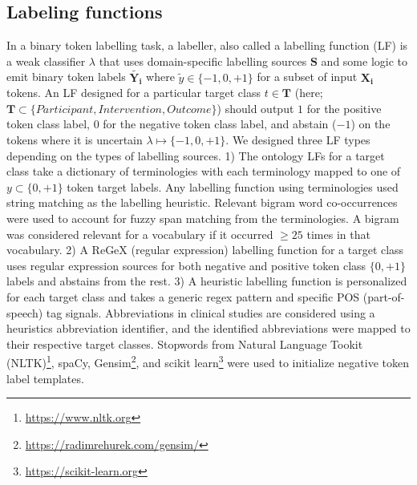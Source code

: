 \documentclass[10.7pt,]{article}
\begin{document}
\subsection{Labeling functions}\label{lfs}
%
In a binary token labelling task, a labeller, also called a labelling function (LF) is a weak classifier $\lambda$ that uses domain-specific labelling sources $\bm{S}$ and some logic to emit binary token labels $ \widetilde{\bm{Y_{i}}}$ where $ \widetilde{y} \in \{-1, 0, +1\}$ for a subset of input $\bm{X_{i}}$ tokens.
An LF designed for a particular target class $t \in \bm{T}$ (here; $\bm{T} \subset \{ Participant, Intervention, Outcome \} $) should output  $1$ for the positive token class label, $0$ for the negative token class label, and abstain ($-1$) on the tokens where it is uncertain $\lambda \mapsto \{-1, 0, +1\}$.
We designed three LF types depending on the types of labelling sources.
1) The ontology LFs for a target class take a dictionary of terminologies with each terminology mapped to one of $y \subset \{0, +1\} $ token target labels.
Any labelling function using terminologies used string matching as the labelling heuristic.
Relevant bigram word co-occurrences were used to account for fuzzy span matching from the terminologies.
A bigram was considered relevant for a vocabulary if it occurred $\geq25$ times in that vocabulary.
2) A ReGeX (regular expression) labelling function for a target class uses regular expression sources for both negative and positive token class $\{0, +1\}$ labels and abstains from the rest.
3) A heuristic labelling function is personalized for each target class and takes a generic regex pattern and specific POS (part-of-speech) tag signals.
Abbreviations in clinical studies are considered using a heuristics abbreviation identifier, and the identified abbreviations were mapped to their respective target classes.
Stopwords from Natural Language Tookit (NLTK)\footnote{\url{https://www.nltk.org}}, spaCy, Gensim\footnote{\url{https://radimrehurek.com/gensim/}}, and scikit learn\footnote{\url{https://scikit-learn.org}} were used to initialize negative token label templates.
%
\end{document}
